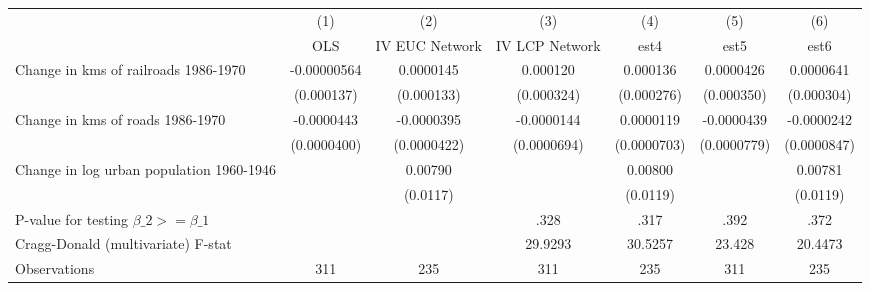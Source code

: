 {
\def\sym#1{\ifmmode^{#1}\else\(^{#1}\)\fi}
\begin{tabular}{l*{6}{c}}
\hline\hline
                &\multicolumn{1}{c}{(1)}&\multicolumn{1}{c}{(2)}&\multicolumn{1}{c}{(3)}&\multicolumn{1}{c}{(4)}&\multicolumn{1}{c}{(5)}&\multicolumn{1}{c}{(6)}\\
                &\multicolumn{1}{c}{OLS}&\multicolumn{1}{c}{IV EUC Network}&\multicolumn{1}{c}{IV LCP Network}&\multicolumn{1}{c}{est4}&\multicolumn{1}{c}{est5}&\multicolumn{1}{c}{est6}\\
\hline
Change in kms of railroads 1986-1970&-0.00000564         &0.0000145         & 0.000120         & 0.000136         &0.0000426         &0.0000641         \\
                &(0.000137)         &(0.000133)         &(0.000324)         &(0.000276)         &(0.000350)         &(0.000304)         \\
[1em]
Change in kms of roads 1986-1970&-0.0000443         &-0.0000395         &-0.0000144         &0.0000119         &-0.0000439         &-0.0000242         \\
                &(0.0000400)         &(0.0000422)         &(0.0000694)         &(0.0000703)         &(0.0000779)         &(0.0000847)         \\
[1em]
Change in log urban population 1960-1946&                  &  0.00790         &                  &  0.00800         &                  &  0.00781         \\
                &                  & (0.0117)         &                  & (0.0119)         &                  & (0.0119)         \\
\hline
P-value for testing $\beta\_{2} >= \beta\_{1}$&                  &                  &     .328         &     .317         &     .392         &     .372         \\
Cragg-Donald (multivariate) F-stat&                  &                  &  29.9293         &  30.5257         &   23.428         &  20.4473         \\
Observations    &      311         &      235         &      311         &      235         &      311         &      235         \\
\hline\hline
\end{tabular}
}
